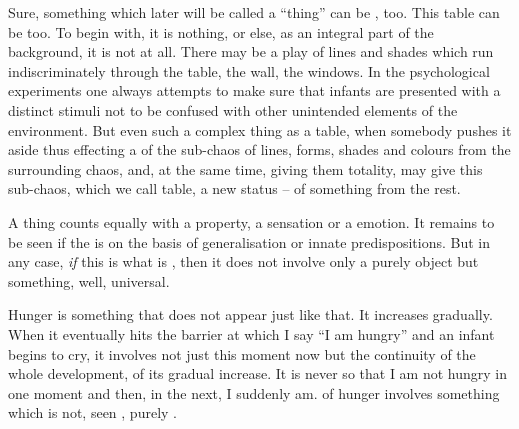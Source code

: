 Sure, something which later will be called a ``thing'' can be
, too. This table can be  too. To begin
with, it is nothing, or else, as an integral part of the background, it is not
at all. There may be a play of lines and shades which run indiscriminately
through the table, the wall, the windows. In the psychological experiments one
always attempts to make sure that infants are presented with a distinct stimuli
not to be confused with other unintended elements of the environment. But even
such a complex thing as a table, when somebody pushes it aside thus effecting a
 of the sub-chaos of lines, forms, shades and colours from the
surrounding chaos, and, at the same time, giving them totality, may give this
sub-chaos, which we call table, a new status -- of something  from
the rest.  

\pa
A  {thing} counts equally with a  property,
a  sensation or a  emotion.  It remains to
be seen if the  is  on the basis of
generalisation or innate predispositions.  But in any case, {\em if} this is
what is , then it does not involve only a purely 
object but something, well, universal.

Hunger is something that does not appear just like that. It increases gradually.
When it eventually hits the barrier at which I say ``I am hungry'' and an infant
begins to cry, it involves not just this moment now but the continuity of the
whole development, of its gradual increase. It is never so that I am not hungry
in one moment and then, in the next, I suddenly am.  of hunger
involves something which is not, seen , purely .

